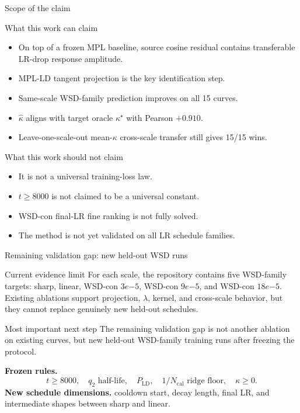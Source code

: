 \documentclass[9pt,aspectratio=169]{beamer}
\newcommand{\tightlist}{\setlength{\itemsep}{2pt}\setlength{\parskip}{0pt}}
\begin{document}
\begin{frame}{Scope of the claim}
\small
\begin{block}{What this work can claim}
\begin{itemize}\tightlist
\item On top of a frozen MPL baseline, source cosine residual contains transferable LR-drop response amplitude.
\item MPL-LD tangent projection is the key identification step.
\item Same-scale WSD-family prediction improves on all 15 curves.
\item \(\widehat\kappa\) aligns with target oracle \(\kappa^\star\) with Pearson \(+0.910\).
\item Leave-one-scale-out mean-\(\kappa\) cross-scale transfer still gives 15/15 wins.
\end{itemize}
\end{block}
\vfill
\begin{alertblock}{What this work should not claim}
\begin{itemize}\tightlist
\item It is not a universal training-loss law.
\item \(t\ge8000\) is not claimed to be a universal constant.
\item WSD-con final-LR fine ranking is not fully solved.
\item The method is not yet validated on all LR schedule families.
\end{itemize}
\end{alertblock}
\end{frame}

\begin{frame}{Remaining validation gap: new held-out WSD runs}
\small
\begin{block}{Current evidence limit}
For each scale, the repository contains five WSD-family targets:
sharp, linear, WSD-con \(3e{-5}\), WSD-con \(9e{-5}\), and WSD-con \(18e{-5}\).
Existing ablations support projection, \(\lambda\), kernel, and cross-scale behavior,
but they cannot replace genuinely new held-out schedules.
\end{block}
\vfill
\begin{alertblock}{Most important next step}
The remaining validation gap is not another ablation on existing curves,
but new held-out WSD-family training runs after freezing the protocol.
\end{alertblock}
\vfill
\textbf{Frozen rules.}
\[
t\ge8000,\quad
q_2\text{ half-life},\quad
P_{\mathrm{LD}},\quad
1/N_{\mathrm{cal}}\text{ ridge floor},\quad
\kappa\ge0.
\]
\vfill
\textbf{New schedule dimensions.}
cooldown start, decay length, final LR, and intermediate shapes between sharp and linear.
\end{frame}
\end{document}
